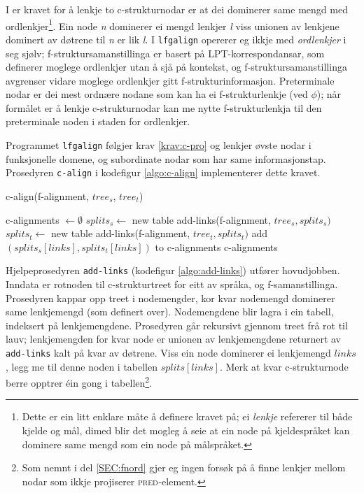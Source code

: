 \documentclass[12pt,a4paper,oneside,draft]{report}
\newcommand{\F}[2]{\textsc{#1}\ensuremath{_{#2}}}
\newcommand{\PRED}{\F{pred}{}}
\begin{document}
I \citet[s.~77]{dyvik2009lmp} er kravet for å lenkje to
c\hyp{}strukturnodar er at dei dominerer same mengd med
ordlenkjer\footnote{Dette er ein litt enklare måte å definere kravet på; ei
        \emph{lenkje} refererer til både kjelde og mål, dimed blir det
        mogleg å seie at ein node på kjeldespråket kan dominere same
        mengd som ein node på målspråket. }. Ein node \emph{n} dominerer ei mengd lenkjer \emph{l} viss
unionen av lenkjene dominert av døtrene til \emph{n} er lik \emph{l}. I
\texttt{lfgalign} opererer eg ikkje med \emph{ordlenkjer} i seg sjølv;
f\hyp{}struktursamanstillinga er basert på LPT\hyp{}korrespondansar, som
definerer moglege ordlenkjer utan å sjå på kontekst, og
f\hyp{}struktursamanstillinga avgrenser vidare moglege ordlenkjer gitt
f\hyp{}strukturinformasjon. Preterminale nodar er dei mest ordnære nodane
som kan ha ei f\hyp{}strukturlenkje (ved $\phi$); når formålet er å lenkje
c\hyp{}strukturnodar kan me nytte f\hyp{}strukturlenkja til den preterminale
noden i staden for ordlenkjer.

Programmet \texttt{lfgalign} følgjer krav \ref{krav:c-pro} og
lenkjer øvste nodar i funksjonelle domene, og subordinate nodar som
har same informasjonstap. Prosedyren \texttt{c-align} i kodefigur
\ref{algo:c-align} implementerer dette kravet. 

 \begin{algorithm}[htbp]
   \caption{c-align(f-alignment, $tree_s$, $tree_t$)}
   \label{algo:c-align}
    
   c-alignments $\gets \emptyset$ \;
   $splits_s \gets$ new table \;
   add-links(f-alignment, $tree_s, splits_s)$  \;
   $splits_t \gets$ new table \;
   add-links(f-alignment, $tree_t, splits_t)$  \;
    {
        {
             add $(splits_s[links],splits_t[links])$ to c-alignments \;
        }
    }
    \Return c-alignments \;
    \end{algorithm}    

Hjelpeprosedyren \texttt{add-links} (kodefigur \ref{algo:add-links}) utfører
 hovudjobben. Inndata er rotnoden til c\hyp{}strukturtreet for eitt av
 språka, og f-samanstillinga. Prosedyren kappar opp treet i
 nodemengder, kor kvar nodemengd dominerer same lenkjemengd (som
 definert over).  Nodemengdene blir lagra i ein tabell, indeksert på
 lenkjemengdene. Prosedyren går rekursivt gjennom treet frå rot til
 lauv; lenkjemengden for kvar node er unionen av lenkjemengdene
 returnert av \texttt{add-links} kalt på kvar av døtrene. Viss ein node
 dominerer ei lenkjemengd $links$, legg me til denne noden i tabellen
 $splits[links]$. Merk at kvar c\hyp{}strukturnode berre opptrer éin gong i
 tabellen\footnote{Som nemnt i del \ref{SEC:fnord} gjer eg ingen forsøk på å
        finne lenkjer mellom nodar som ikkje projiserer
        \PRED{}-element. }.
\end{document}
